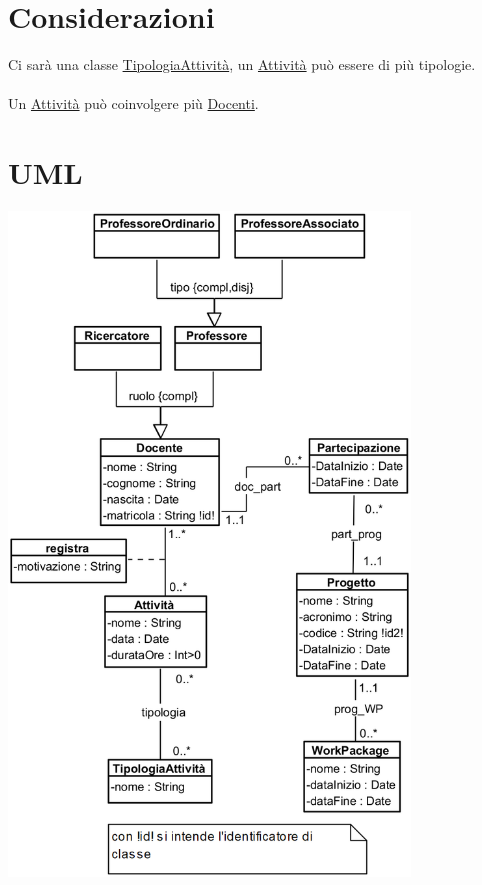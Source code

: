 \documentclass[12pt, letterpaper]{article}
\newcommand{\acc}{\\\hphantom{}\\}
\begin{document}
\section{Considerazioni}
Ci sarà una classe \underline{TipologiaAttività}, un \underline{Attività} può essere di 
più tipologie.\acc Un \underline{Attività} può coinvolgere più \underline{Docenti}.\newpage
\section{UML}\begin{center}
    
    \includegraphics[width=0.8\textwidth]{images/UML.png}
\end{center}
\end{document}

